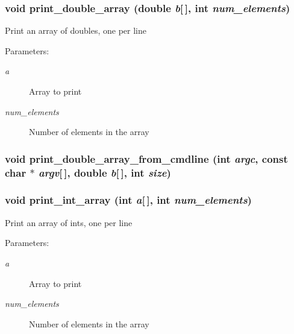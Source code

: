 \subsubsection{\setlength{\rightskip}{0pt plus 5cm}void print\_\-double\_\-array (double {\em b}[$\,$], int {\em num\_\-elements})}\label{print__arrays_8h_2c63d62a01ac25bf7c4fa67be16bf004}


Print an array of doubles, one per line \begin{Desc}
\item[Parameters:]
\begin{description}
\item[{\em a}]Array to print \item[{\em num\_\-elements}]Number of elements in the array \end{description}
\end{Desc}
\subsubsection{\setlength{\rightskip}{0pt plus 5cm}void print\_\-double\_\-array\_\-from\_\-cmdline (int {\em argc}, const char $\ast$ {\em argv}[$\,$], double {\em b}[$\,$], int {\em size})}\label{print__arrays_8h_05525f053bc8e48ffb6709b604f2962c}


\subsubsection{\setlength{\rightskip}{0pt plus 5cm}void print\_\-int\_\-array (int {\em a}[$\,$], int {\em num\_\-elements})}\label{print__arrays_8h_095c9149423818a7dbfe4003e5940f97}


Print an array of ints, one per line \begin{Desc}
\item[Parameters:]
\begin{description}
\item[{\em a}]Array to print \item[{\em num\_\-elements}]Number of elements in the array \end{description}
\end{Desc}
